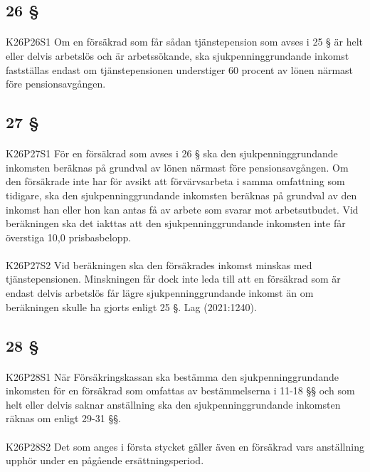 \documentclass[a4paper,notitlepage,openany,10pt]{book}
\begin{document}
\subsection*{26 §}
\paragraph*{}
{\tiny K26P26S1}
Om en försäkrad som får sådan tjänstepension som avses i 25 § är helt eller delvis arbetslös och är arbetssökande, ska sjukpenninggrundande inkomst fastställas endast om tjänstepensionen understiger 60 procent av lönen närmast före pensionsavgången.
\subsection*{27 §}
\paragraph*{}
{\tiny K26P27S1}
För en försäkrad som avses i 26 § ska den sjukpenninggrundande inkomsten beräknas på grundval av lönen närmast före pensionsavgången. Om den försäkrade inte har för avsikt att förvärvsarbeta i samma omfattning som tidigare, ska den sjukpenninggrundande inkomsten beräknas på grundval av den inkomst han eller hon kan antas få av arbete som svarar mot arbetsutbudet. Vid beräkningen ska det iakttas att den sjukpenninggrundande inkomsten inte får överstiga 10,0 prisbasbelopp.
\paragraph*{}
{\tiny K26P27S2}
Vid beräkningen ska den försäkrades inkomst minskas med tjänstepensionen. Minskningen får dock inte leda till att en försäkrad som är endast delvis arbetslös får lägre sjukpenninggrundande inkomst än om beräkningen skulle ha gjorts enligt 25 §.
Lag (2021:1240).
\subsection*{28 §}
\paragraph*{}
{\tiny K26P28S1}
När Försäkringskassan ska bestämma den sjukpenninggrundande inkomsten för en försäkrad som omfattas av bestämmelserna i 11-18 §§ och som helt eller delvis saknar anställning ska den sjukpenninggrundande inkomsten räknas om enligt 29-31 §§.
\paragraph*{}
{\tiny K26P28S2}
Det som anges i första stycket gäller även en försäkrad vars anställning upphör under en pågående ersättningsperiod.
\end{document}
